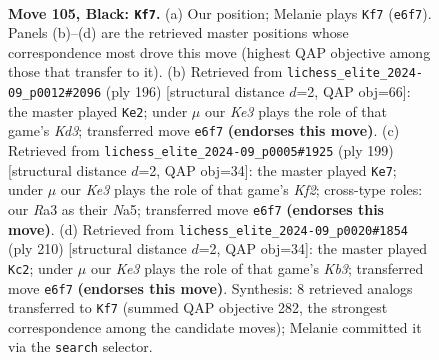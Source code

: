 \documentclass[11pt]{article}
\begin{document}
\clearpage

\begin{figure}[p]\centering
\begin{subfigure}{0.46\textwidth}\centering
\resizebox{\linewidth}{!}{%
\newchessgame
\chessboard[
  setfen={4R3/8/4k3/8/8/r7/6K1/3r4 b - - 21 105},
  showmover=false,
  pgfstyle=straightmove, color=movearrow, markmove={e6-f7}
]}
\caption{}
\end{subfigure}\hfill
\begin{subfigure}{0.46\textwidth}\centering
\resizebox{\linewidth}{!}{%
\newchessgame
\chessboard[
  setfen={2k5/7R/8/8/8/3K1r2/8/8 w - - 75 99},
  showmover=false,
  pgfstyle=straightmove, color=movearrow, markmove={d3-e2}
]}
\caption{}
\end{subfigure}
\\[4pt]
\begin{subfigure}{0.46\textwidth}\centering
\resizebox{\linewidth}{!}{%
\newchessgame
\chessboard[
  setfen={8/5k2/8/n7/8/5R2/1r6/4K3 b - - 87 100},
  showmover=false,
  pgfstyle=straightmove, color=movearrow, markmove={f7-e7}
]}
\caption{}
\end{subfigure}\hfill
\begin{subfigure}{0.46\textwidth}\centering
\resizebox{\linewidth}{!}{%
\newchessgame
\chessboard[
  setfen={6R1/1r6/8/8/8/1K6/8/7k w - - 50 106},
  showmover=false,
  pgfstyle=straightmove, color=movearrow, markmove={b3-c2}
]}
\caption{}
\end{subfigure}
\caption{\textbf{Move 105, Black: \texttt{Kf7}.} (a) Our position; Melanie plays \texttt{Kf7} (\texttt{e6f7}). Panels (b)--(d) are the retrieved master positions whose correspondence most drove this move (highest QAP objective among those that transfer to it). (b) Retrieved from \texttt{lichess\_elite\_2024-09\_p0012\#2096} (ply 196) [structural distance $d$=2, QAP obj=66]: the master played \texttt{Ke2}; under $\mu$ our \emph{Ke3} plays the role of that game's \emph{Kd3}; transferred move \texttt{e6f7} \textbf{(endorses this move)}. (c) Retrieved from \texttt{lichess\_elite\_2024-09\_p0005\#1925} (ply 199) [structural distance $d$=2, QAP obj=34]: the master played \texttt{Ke7}; under $\mu$ our \emph{Ke3} plays the role of that game's \emph{Kf2}; cross-type roles: our \emph{R}a3 as their \emph{N}a5; transferred move \texttt{e6f7} \textbf{(endorses this move)}. (d) Retrieved from \texttt{lichess\_elite\_2024-09\_p0020\#1854} (ply 210) [structural distance $d$=2, QAP obj=34]: the master played \texttt{Kc2}; under $\mu$ our \emph{Ke3} plays the role of that game's \emph{Kb3}; transferred move \texttt{e6f7} \textbf{(endorses this move)}. Synthesis: 8 retrieved analogs transferred to \texttt{Kf7} (summed QAP objective 282, the strongest correspondence among the candidate moves); Melanie committed it via the \texttt{search} selector.}
\label{fig:thought-m209}
\end{figure}
\end{document}
